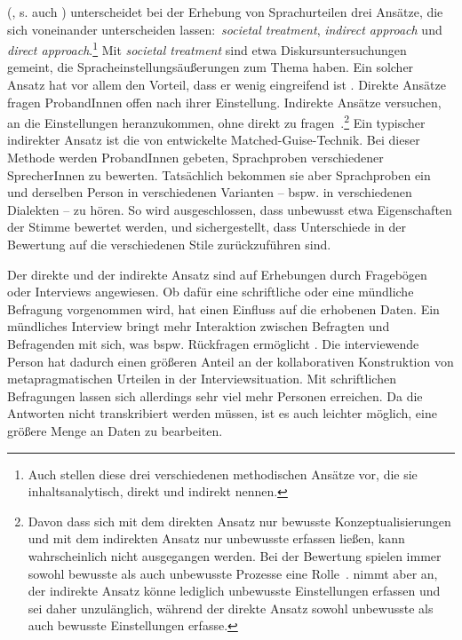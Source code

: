 \citeauthor{Garrett2005} (\citeyear{Garrett2005}, s. auch  \citealp[37]{Garrett.2012}) unterscheidet bei der Erhebung von Sprach\-ur\-tei\-len drei Ans{\"a}tze, die sich voneinander unterscheiden lassen:~\textit{societal treatment}, \textit{indirect approach} und \textit{direct approach}.\footnote{Auch \citet[212--213]{Cargile.1994} stellen diese drei verschiedenen methodischen Ans{\"a}tze vor, die sie inhaltsanalytisch, direkt und indirekt nennen.} 
Mit \textit{societal treatment} sind etwa Diskursuntersuchungen gemeint, die %
Spracheinstellungsäußerungen %
zum Thema haben. 
Ein solcher Ansatz hat vor allem den Vorteil, dass er wenig eingreifend ist \citep[s.][52]{Garrett.2012}. 
Direkte Ans{\"a}tze fragen ProbandInnen offen nach ihrer Einstellung. 
Indirekte Ans{\"a}tze versuchen, an die Einstellungen heranzukommen, ohne direkt zu fragen~\citep[s.][]{Garrett2005}.\footnote{Davon dass sich mit dem direkten Ansatz nur bewusste Konzeptualisierungen und mit dem indirekten Ansatz nur unbewusste erfassen lie{\ss}en, kann wahrscheinlich nicht ausgegangen werden. 
Bei der Bewertung spielen immer sowohl bewusste als auch unbewusste Prozesse eine Rolle~\citep[s.][4--5]{Preston2010b}. 
\citet[178--179]{Studler.2014} nimmt aber an, der indirekte Ansatz k{\"o}nne lediglich unbewusste Einstellungen erfassen und sei daher unzul{\"a}nglich, w{\"a}hrend der direkte Ansatz sowohl unbewusste als auch bewusste Einstellungen erfasse.}
Ein typischer indirekter Ansatz ist die von \citet{Lambert.1960} entwickelte Matched-Guise-Technik. Bei dieser Methode werden ProbandInnen gebeten, Sprachproben verschiedener SprecherInnen zu bewerten. Tatsächlich bekommen sie aber Sprachproben ein und derselben Person in verschiedenen Varianten -- bspw. in verschiedenen Dialekten -- zu hören. So wird ausgeschlossen, dass unbewusst etwa Eigenschaften der Stimme bewertet werden, und sichergestellt, dass Unterschiede in der Bewertung auf die verschiedenen Stile zurückzuführen sind. 

Der direkte und der indirekte Ansatz sind auf Erhebungen durch Fragebögen oder Interviews angewiesen. 
Ob dafür eine schriftliche oder eine mündliche Befragung vorgenommen wird, hat einen Einfluss auf die erhobenen Daten. 
Ein mündliches Interview bringt mehr Interaktion zwischen Befragten und Befragenden mit sich, was bspw. Rückfragen ermöglicht \citep[s.][1255]{Garrett2005}. 
Die interviewende Person hat dadurch einen größeren Anteil an der kollaborativen Konstruktion von metapragmatischen Urteilen in der Interviewsituation. 
Mit schriftlichen Befragungen lassen sich allerdings sehr viel mehr Personen erreichen. 
Da die Antworten nicht transkribiert werden müssen, ist es auch leichter möglich, eine größere Menge an Daten zu bearbeiten. 

